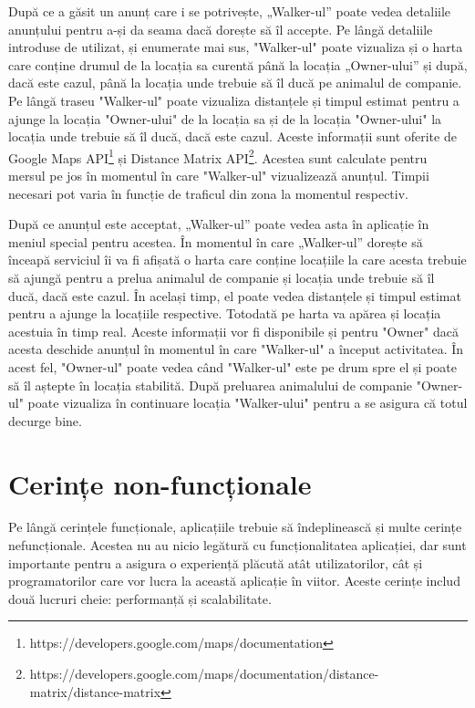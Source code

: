 După ce a găsit un anunț care i se potrivește, „Walker-ul” poate vedea detaliile anunțului pentru a-și da seama dacă dorește să îl accepte. Pe lângă detaliile introduse de utilizat, și enumerate mai sus, "Walker-ul" poate vizualiza și o harta care conține drumul de la locația sa curentă până la locația „Owner-ului” și după, dacă este cazul, până la locația unde trebuie să îl ducă pe animalul de companie. Pe lângă traseu "Walker-ul" poate vizualiza distanțele și timpul estimat pentru a ajunge la locația "Owner-ului" de la locația sa și de la locația "Owner-ului" la locația unde trebuie să îl ducă, dacă este cazul. Aceste informații sunt oferite de Google Maps API\footnote{https://developers.google.com/maps/documentation} și Distance Matrix API\footnote{https://developers.google.com/maps/documentation/distance-matrix/distance-matrix}. Acestea sunt calculate pentru mersul pe jos în momentul în care "Walker-ul" vizualizează anunțul. Timpii necesari pot varia în funcție de traficul din zona la momentul respectiv.


După ce anunțul este acceptat, „Walker-ul” poate vedea asta în aplicație în meniul special pentru acestea. În momentul în care „Walker-ul” dorește să înceapă serviciul îi va fi afișată o harta care conține locațiile la care acesta trebuie să ajungă pentru a prelua animalul de companie și locația unde trebuie să îl ducă, dacă este cazul. În același timp, el poate vedea distanțele și timpul estimat pentru a ajunge la locațiile respective. Totodată pe harta va apărea și locația acestuia în timp real. Aceste informații vor fi disponibile și pentru "Owner" dacă acesta deschide anunțul în momentul în care "Walker-ul" a început activitatea. În acest fel, "Owner-ul" poate vedea când "Walker-ul" este pe drum spre el și poate să îl aștepte în locația stabilită. După preluarea animalului de companie "Owner-ul" poate vizualiza în continuare locația "Walker-ului" pentru a se asigura că totul decurge bine.



\section{Cerințe non-funcționale}
 
Pe lângă cerințele funcționale, aplicațiile trebuie să îndeplinească și multe cerințe nefuncționale. Acestea nu au nicio legătură cu funcționalitatea aplicației, dar sunt importante pentru a asigura o experiență plăcută atât utilizatorilor, cât și programatorilor care vor lucra la această aplicație în viitor. Aceste cerințe includ două lucruri cheie: performanță și scalabilitate. 

